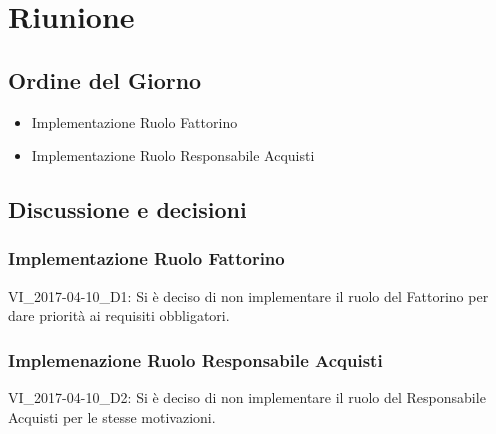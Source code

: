 \section{Riunione}
\subsection{Ordine del Giorno}
\begin{itemize}
	\item Implementazione Ruolo Fattorino
	\item Implementazione Ruolo Responsabile Acquisti
\end{itemize}

\subsection{Discussione e decisioni}

\subsubsection{Implementazione Ruolo Fattorino}
VI\_2017-04-10\_D1: Si è deciso di non implementare il ruolo del Fattorino per dare priorità ai requisiti obbligatori.

\subsubsection{Implemenazione Ruolo Responsabile Acquisti}
VI\_2017-04-10\_D2: Si è deciso di non implementare il ruolo del Responsabile Acquisti per le stesse motivazioni.

\clearpage
